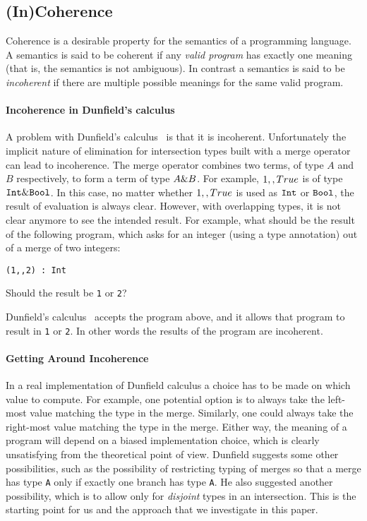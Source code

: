 \subsection{(In)Coherence} \label{subsec:incoherence}

Coherence is a desirable property for the semantics of a programming
language. A semantics is said to be coherent if any \emph{valid
  program} has exactly one meaning~\cite{reynolds1991coherence} (that
is, the semantics is not ambiguous). In contrast a semantics is said
to be \emph{incoherent} if there are multiple possible meanings for
the same valid program. 

\paragraph{Incoherence in Dunfield's calculus}
A problem with Dunfield's calculus~\cite{dunfield2014elaborating} is
that it is incoherent.  Unfortunately the implicit nature of
elimination for intersection types built with a merge operator can
lead to incoherence.  The merge operator combines two terms, of type
$A$ and $B$ respectively, to form a term of type $A \& B$. For
example, $1 ,, True$ is of type $\texttt{Int} \&
\texttt{Bool}$. In this case, no matter whether $1 ,, True$ is used as
$\texttt{Int}$ or $\texttt{Bool}$, the result of evaluation is always
clear. However, with overlapping types, it is not clear 
anymore to see the intended result. For example, what should be the result of
the following program, which asks for an integer (using a type annotation) out
of a merge of two integers:
\begin{lstlisting}
(1,,2) : Int
\end{lstlisting}
Should the result be \lstinline$1$ or \lstinline$2$?

Dunfield's calculus~\cite{dunfield2014elaborating} accepts the program
above, and it allows that program to result in \lstinline$1$ or \lstinline$2$.
In other words the results of the program are incoherent.

\paragraph{Getting Around Incoherence}
In a real implementation of Dunfield calculus a choice has to be made
on which value to compute. For example, one potential option is to
always take the left-most value matching the type in the
merge. Similarly, one could always take the right-most value matching
the type in the merge. Either way, the meaning of a program will
depend on a biased implementation choice, which is clearly
unsatisfying from the theoretical point of view.  Dunfield suggests
some other possibilities, such as the possibility of restricting typing
of merges so that a merge has type \lstinline$A$ only if exactly one
branch has type \lstinline$A$. He also suggested another possibility,
which is to allow only for \emph{disjoint} types in an intersection.
This is the starting point for us and the approach that we 
investigate in this paper. 


